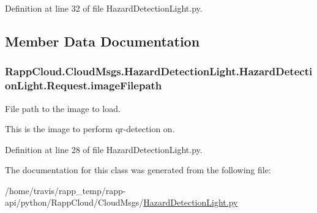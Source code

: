 Definition at line 32 of file Hazard\-Detection\-Light.\-py.



\subsection{Member Data Documentation}
\hypertarget{classRappCloud_1_1CloudMsgs_1_1HazardDetectionLight_1_1HazardDetectionLight_1_1Request_ad62dadb89604b1181641b9bde0e83bc1}{
\subsubsection[{image\-Filepath}]{\setlength{\rightskip}{0pt plus 5cm}Rapp\-Cloud.\-Cloud\-Msgs.\-Hazard\-Detection\-Light.\-Hazard\-Detection\-Light.\-Request.\-image\-Filepath}}\label{classRappCloud_1_1CloudMsgs_1_1HazardDetectionLight_1_1HazardDetectionLight_1_1Request_ad62dadb89604b1181641b9bde0e83bc1}


File path to the image to load. 

This is the image to perform qr-\/detection on. 

Definition at line 28 of file Hazard\-Detection\-Light.\-py.



The documentation for this class was generated from the following file\-:\begin{DoxyCompactItemize}
\item 
/home/travis/rapp\-\_\-temp/rapp-\/api/python/\-Rapp\-Cloud/\-Cloud\-Msgs/\hyperlink{HazardDetectionLight_8py}{Hazard\-Detection\-Light.\-py}\end{DoxyCompactItemize}
